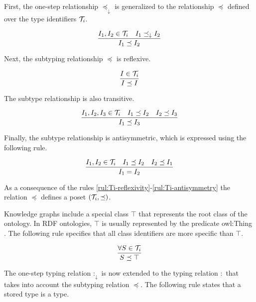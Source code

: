 \documentclass[runningheads]{llncs}
\newcommand{\darr}{\downarrow}
\newcommand{\T}{{\cal T}}
\begin{document}
First, the one-step relationship $\preceq_\darr$ is generalized to the
relationship $\preceq$ defined over the type identifiers
$\T_i$. 

\begin{equation}
\label{rul:Ic-extended}
\dfrac{I_1,I_2\in\T_i \quad I_1\preceq_\darr\/I_2}
      {I_1 \preceq I_2}
\end{equation}

Next, the subtyping relationship $\preceq$ is reflexive.

\begin{equation}
\label{rul:Ti-reflexivity}
\dfrac{I\in\T_i}
      {I\preceq\/I}
\end{equation}

The subtype relationship is also transitive. 

\begin{equation}
\label{rul:Ti-transitivity}
\dfrac{I_1,I_2,I_3\in\T_i\quad\/I_1\preceq\/I_2\quad\/I_2\preceq\/I_3}
      {I_1\preceq\/I_3}   
\end{equation}

Finally, the subtype relationship is antisymmetric, which is expressed
using the following rule.

\begin{equation}
\label{rul:Ti-antisymmetry}
\dfrac{I_1,I_2\in\T_i \quad I_1\preceq\/I_2 \quad I_2\preceq\/I_1}
      {I_1=I_2}   
\end{equation}

As a consequence of the rules
\ref{rul:Ti-reflexivity}-\ref{rul:Ti-antisymmetry} the relation
$\preceq$ defines a poset $(\T_i,\preceq)$.

Knowledge graphs include a special class $\top$ that represents the
root class of the ontology. In RDF ontologies, $\top$ is usually
represented by the predicate owl:Thing \cite{Hoffart2013}. The
following rule specifies that all class identifiers are more specific
than $\top$.

\begin{equation}
\dfrac{\forall\/S\in\T_i}
      {S\preceq\top}
\end{equation}

The one-step typing relation $:_\darr$ is now extended to the typing
relation $:$ that takes into account the subtyping relation $\preceq$.
The following rule states that a stored type is a type.
\end{document}
